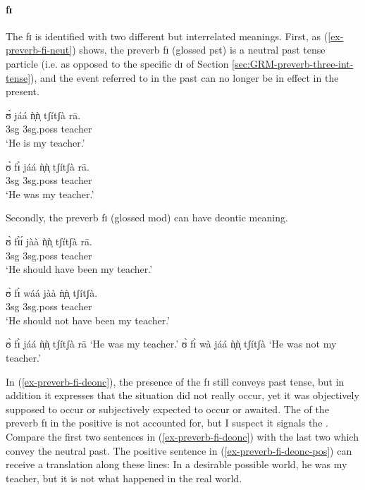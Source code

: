 \begin{exe}
\begin{exe}
\begin{exe}
\begin{exe}
\begin{exe}
\begin{exe}
\begin{exe}
\begin{exe}
\begin{exe}
\begin{exe}
\begin{exe}
\begin{exe}
\paragraph{fɪ}

The  {\sls fɪ}   is identified with two different but interrelated 
meanings.  First, as (\ref{ex-preverb-fi-neut}) shows, the preverb {\sls fɪ}  
(glossed {\sc pst}) is a neutral past tense particle (i.e.  as opposed to the 
specific  {\sls dɪ} of  Section \ref{sec:GRM-preverb-three-int-tense}), and the 
event referred to in the past can no longer be in effect in the present.


\ea\label{ex-preverb-fi-neut}

\ea
\gll ʊ̀ jáá  ǹ̩ǹ̩ tʃítʃà rā.\\
  {\sc 3sg} {\ident} {\sc 3sg.poss}  teacher {\foc}\\
\glt  `He is my {\sc teacher}.' 

\ex
\gll   ʊ̀  fɪ̀ jáá  ǹ̩ǹ̩ tʃítʃà  rā.\\
  {\sc 3sg} {\pst} {\ident} {\sc 3sg.poss}  teacher {\foc}\\
\glt  `He was my {\sc teacher}.' 

\z 
 \z 

 Secondly, the preverb {\sls fɪ}   (glossed {\sc mod}) can have  deontic
meaning.  


\ea\label{ex-preverb-fi-deonc}

\ea\label{ex-preverb-fi-deonc-pos}
\gll ʊ̀ fɪ̀ɪ́ jàà  ǹ̩ǹ̩ tʃítʃà rā.\\
  {\sc 3sg}  {\mod}  {\ident} {\sc 3sg.poss}  teacher {\foc}\\
\glt  `He should have been my {\sc teacher}.' 

\ex
\gll ʊ̀ fɪ̀ wáá jàà  ǹ̩ǹ̩ tʃítʃà.\\
  {\sc 3sg} {\mod} {\neg} {\ident} {\sc 3sg.poss}  teacher\\
\glt   `He should not have been my {\sc teacher}.'  


\ex
 ʊ̀  fɪ̀ jáá  ǹ̩ǹ̩ tʃítʃà  rā  {\rm `He was my {\sc teacher}.'}
\ex
 ʊ̀  fɪ̀ wà jáá  ǹ̩ǹ̩ tʃítʃà {\rm `He was not my teacher.'}

\z 
 \z 


In (\ref{ex-preverb-fi-deonc}),  the  presence of the  {\sls fɪ} still conveys  past tense, but in addition it expresses that the situation did not really occur, yet it was objectively supposed to occur or subjectively expected to occur or awaited. The  of the preverb {\sls fɪ} in the positive  is not accounted for, but I suspect it  signals the . Compare the first two sentences in (\ref{ex-preverb-fi-deonc}) with the last two  which convey the neutral past.  The positive sentence in (\ref{ex-preverb-fi-deonc-pos}) can receive  a translation along these lines:  In a desirable possible world, he was my teacher, but it is not what happened in the real world. 



\end{exe}
\end{exe}
\end{exe}
\end{exe}
\end{exe}
\end{exe}
\end{exe}
\end{exe}
\end{exe}
\end{exe}
\end{exe}
\end{exe}
